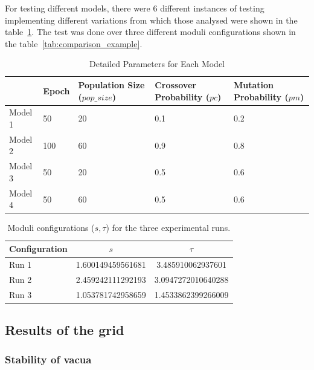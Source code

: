 \documentclass[runningheads]{llncs}
\begin{document}
For testing different models, there were 6 different instances
of testing implementing different variations from which those
analysed were shown in the table~\ref{tab:detailed_parameters}.
The test was done over three different moduli configurations shown in
the table~\ref{tab:comparison_example}.

\begin{table}[h]
    \small
    \centering
    \caption{Detailed Parameters for Each Model}
    \label{tab:detailed_parameters}
    \renewcommand{\arraystretch}{1.3} %
    \begin{tabular}{p{2cm} p{2cm} p{2cm} p{2cm} p{2cm}}
        \hline
        & \textbf{Epoch} & \textbf{Population Size (\(pop\_size\))} & \textbf{Crossover Probability (\(pc\))} & \textbf{Mutation Probability (\(pm\))} \\
        \hline
        Model 1 & 50 & 20 & 0.1 & 0.2  \\
        Model 2 & 100 & 60 & 0.9 & 0.8 \\
        Model 3 & 50 & 20 & 0.5 & 0.6  \\
        Model 4 & 50 & 60 & 0.5 & 0.6  \\
        \hline
    \end{tabular}
\end{table}

\begin{table}[h]
\centering
\caption{Moduli configurations ($s, \tau$) for the three experimental runs.}
\label{tab:moduli_configs}
\begin{tabular}{@{} l c c @{}}
    \hline
    \textbf{Configuration} & \textbf{$s$} & \textbf{$\tau$} \\
    \hline
    Run 1 & 1.600149459561681 & 3.485910062937601  \\
    Run 2 & 2.459242111292193 & 3.0947272010640288 \\    
    Run 3 & 1.053781742958659 & 1.4533862399266009 \\
    \hline
\end{tabular}
\end{table}

\subsection{Results of the grid}

\subsubsection{Stability of vacua}
\end{document}
